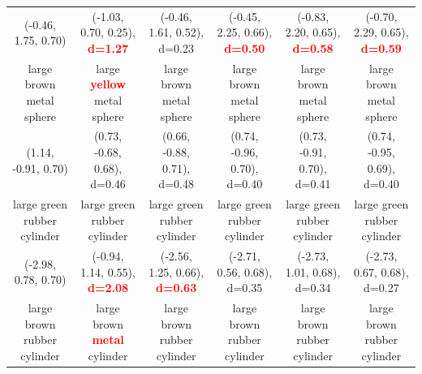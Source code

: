 \documentclass{article}
\begin{document}
\begin{table}[ht!]
{\begin{tabular}{cccccc}
         (-0.46, 1.75, 0.70) &                                                                              (-1.03, 0.70, 0.25), \textcolor{red}{\textbf{d=1.27}} &                              (-0.46, 1.61, 0.52), d=0.23 &   (-0.45, 2.25, 0.66), \textcolor{red}{\textbf{d=0.50}} &   (-0.83, 2.20, 0.65), \textcolor{red}{\textbf{d=0.58}} &   (-0.70, 2.29, 0.65), \textcolor{red}{\textbf{d=0.59}} \\
    large brown metal sphere &                                                                                large \textcolor{red}{\textbf{yellow}} metal sphere &                                 large brown metal sphere &                                large brown metal sphere &                                large brown metal sphere &                                large brown metal sphere \\
         (1.14, -0.91, 0.70) &                                                                                                        (0.73, -0.68, 0.68), d=0.46 &                              (0.66, -0.88, 0.71), d=0.48 &                             (0.74, -0.96, 0.70), d=0.40 &                             (0.73, -0.91, 0.70), d=0.41 &                             (0.74, -0.95, 0.69), d=0.40 \\
 large green rubber cylinder &                                                                                                        large green rubber cylinder &                              large green rubber cylinder &                             large green rubber cylinder &                             large green rubber cylinder &                             large green rubber cylinder \\
         (-2.98, 0.78, 0.70) &                                                                              (-0.94, 1.14, 0.55), \textcolor{red}{\textbf{d=2.08}} &    (-2.56, 1.25, 0.66), \textcolor{red}{\textbf{d=0.63}} &                             (-2.71, 0.56, 0.68), d=0.35 &                             (-2.73, 1.01, 0.68), d=0.34 &                             (-2.73, 0.67, 0.68), d=0.27 \\
 large brown rubber cylinder &                                                                               large brown \textcolor{red}{\textbf{metal}} cylinder &                              large brown rubber cylinder &                             large brown rubber cylinder &                             large brown rubber cylinder &                             large brown rubber cylinder \\

\end{tabular}}
\end{table}
\end{document}
